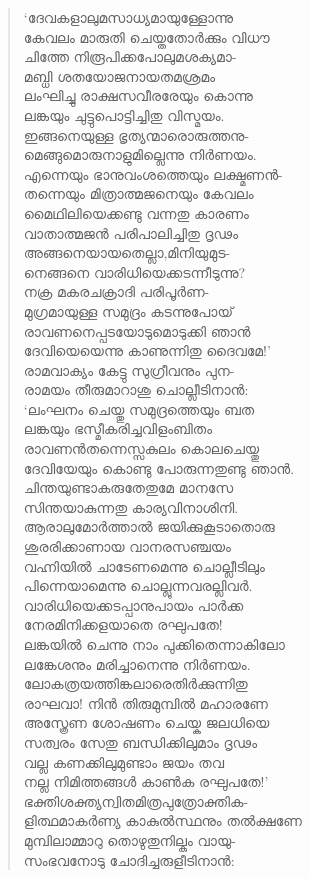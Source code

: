 \begin{verse}
‘ദേവകളാലുമസാധ്യമായുള്ളോന്നു\\
കേവലം മാരുതി ചെയ്തതോര്‍ക്കും വിധൗ\\
ചിത്തേ നിരൂപിക്കപോലുമശക്യമാ-\\
മബ്ധി ശതയോജനായതമശ്രമം\\
ലംഘിച്ചു രാക്ഷസവീരരേയും കൊന്നു\\
ലങ്കയും ചുട്ടുപൊട്ടിച്ചിതു വിസ്മയം.\\
ഇങ്ങനെയുള്ള ഭൃത്യന്മാരൊരുത്തനു-\\
മെങ്ങുമൊരുനാളുമില്ലെന്നു നിര്‍ണയം.\\
എന്നെയും ഭാനുവംശത്തെയും ലക്ഷ്മണന്‍-\\
തന്നെയും മിത്രാത്മജനെയും കേവലം\\
മൈഥിലിയെക്കണ്ടു വന്നതു കാരണം\\
വാതാത്മജന്‍ പരിപാലിച്ചിതു ദൃഢം\\
അങ്ങനെയായതെല്ലാ,മിനിയുമുട-\\
നെങ്ങനെ വാരിധിയെക്കടന്നീടുന്നു?\\
നക്ര മകരചക്രാദി പരിപൂര്‍ണ-\\
മുഗ്രമായുള്ള സമുദ്രം കടന്നുപോയ്\\
രാവണനെപ്പടയോടുമൊടുക്കി ഞാന്‍\\
ദേവിയെയെന്നു കാണുന്നിതു ദൈവമേ!’\\
രാമവാക്യം കേട്ടു സുഗ്രീവനും പുന-\\
രാമയം തീരുമാറാശു ചൊല്ലീടിനാന്‍:\\
‘ലംഘനം ചെയ്തു സമുദ്രത്തെയും ബത\\
ലങ്കയും ഭസ്മീകരിച്ചവിളംബിതം\\
രാവണന്‍തന്നെസ്സകുലം കൊലചെയ്തു\\
ദേവിയേയും കൊണ്ടു പോരുന്നതുണ്ടു ഞാന്‍.\\
ചിന്തയുണ്ടാകരുതേതുമേ മാനസേ\\
സിന്തയാകുന്നതു കാര്യവിനാശിനി.\\
ആരാലുമോര്‍ത്താല്‍ ജയിക്കുകൂടാതൊരു\\
ശുരരിക്കാണായ വാനരസഞ്ചയം \\
വഹ്നിയില്‍ ചാടേണമെന്നു ചൊല്ലീടിലും\\
പിന്നെയാമെന്നു ചൊല്ലുന്നവരല്ലിവര്‍.\\
വാരിധിയെക്കടപ്പാനുപായം പാര്‍ക്ക\\
നേരമിനിക്കളയാതെ രഘുപതേ!\\
ലങ്കയില്‍ ചെന്നു നാം പുക്കിതെന്നാകിലോ\\
ലങ്കേശനും മരിച്ചാനെന്നു നിര്‍ണയം.\\
ലോകത്രയത്തിങ്കലാരെതിര്‍ക്കുന്നിതു\\
രാഘവാ! നിന്‍ തിരുമുമ്പില്‍ മഹാരണേ\\
അസ്ത്രേണ ശോഷണം ചെയ്ക ജലധിയെ\\
സത്വരം സേതു ബന്ധിക്കിലുമാം ദൃഢം\\
വല്ല കണക്കിലുമുണ്ടാം ജയം തവ\\
നല്ല നിമിത്തങ്ങള്‍ കാണ്‍ക രഘുപതേ!’\\
ഭക്തിശക്ത്യന്വിതമിത്രപുത്രോക്തിക-\\
ളിത്ഥമാകര്‍ണ്യ കാകുല്‍സ്ഥനും തല്‍ക്ഷണേ\\
മുമ്പിലാമ്മാറു തൊഴുതുനില്കും വായു-\\
സംഭവനോടു ചോദിച്ചരുളീടിനാന്‍:
\end{verse}

